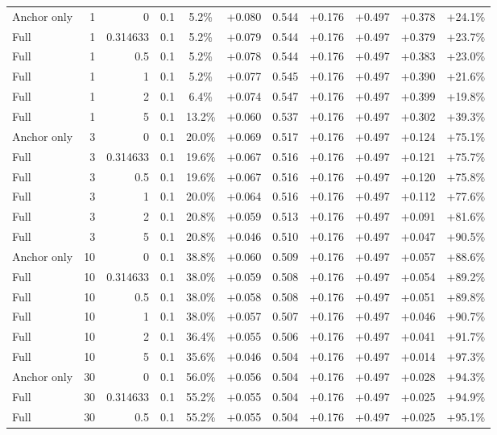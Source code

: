 \begin{table}[htbp]
\begin{tabular}{lrrrccccccc}
Anchor only & 1 & 0 & 0.1 & 5.2\% & +0.080 & 0.544 & +0.176 & +0.497 & +0.378 & +24.1\% \\
Full & 1 & 0.314633 & 0.1 & 5.2\% & +0.079 & 0.544 & +0.176 & +0.497 & +0.379 & +23.7\% \\
Full & 1 & 0.5 & 0.1 & 5.2\% & +0.078 & 0.544 & +0.176 & +0.497 & +0.383 & +23.0\% \\
Full & 1 & 1 & 0.1 & 5.2\% & +0.077 & 0.545 & +0.176 & +0.497 & +0.390 & +21.6\% \\
Full & 1 & 2 & 0.1 & 6.4\% & +0.074 & 0.547 & +0.176 & +0.497 & +0.399 & +19.8\% \\
Full & 1 & 5 & 0.1 & 13.2\% & +0.060 & 0.537 & +0.176 & +0.497 & +0.302 & +39.3\% \\
Anchor only & 3 & 0 & 0.1 & 20.0\% & +0.069 & 0.517 & +0.176 & +0.497 & +0.124 & +75.1\% \\
Full & 3 & 0.314633 & 0.1 & 19.6\% & +0.067 & 0.516 & +0.176 & +0.497 & +0.121 & +75.7\% \\
Full & 3 & 0.5 & 0.1 & 19.6\% & +0.067 & 0.516 & +0.176 & +0.497 & +0.120 & +75.8\% \\
Full & 3 & 1 & 0.1 & 20.0\% & +0.064 & 0.516 & +0.176 & +0.497 & +0.112 & +77.6\% \\
Full & 3 & 2 & 0.1 & 20.8\% & +0.059 & 0.513 & +0.176 & +0.497 & +0.091 & +81.6\% \\
Full & 3 & 5 & 0.1 & 20.8\% & +0.046 & 0.510 & +0.176 & +0.497 & +0.047 & +90.5\% \\
Anchor only & 10 & 0 & 0.1 & 38.8\% & +0.060 & 0.509 & +0.176 & +0.497 & +0.057 & +88.6\% \\
Full & 10 & 0.314633 & 0.1 & 38.0\% & +0.059 & 0.508 & +0.176 & +0.497 & +0.054 & +89.2\% \\
Full & 10 & 0.5 & 0.1 & 38.0\% & +0.058 & 0.508 & +0.176 & +0.497 & +0.051 & +89.8\% \\
Full & 10 & 1 & 0.1 & 38.0\% & +0.057 & 0.507 & +0.176 & +0.497 & +0.046 & +90.7\% \\
Full & 10 & 2 & 0.1 & 36.4\% & +0.055 & 0.506 & +0.176 & +0.497 & +0.041 & +91.7\% \\
Full & 10 & 5 & 0.1 & 35.6\% & +0.046 & 0.504 & +0.176 & +0.497 & +0.014 & +97.3\% \\
Anchor only & 30 & 0 & 0.1 & 56.0\% & +0.056 & 0.504 & +0.176 & +0.497 & +0.028 & +94.3\% \\
Full & 30 & 0.314633 & 0.1 & 55.2\% & +0.055 & 0.504 & +0.176 & +0.497 & +0.025 & +94.9\% \\
Full & 30 & 0.5 & 0.1 & 55.2\% & +0.055 & 0.504 & +0.176 & +0.497 & +0.025 & +95.1\% \\

\end{tabular}
\end{table}
